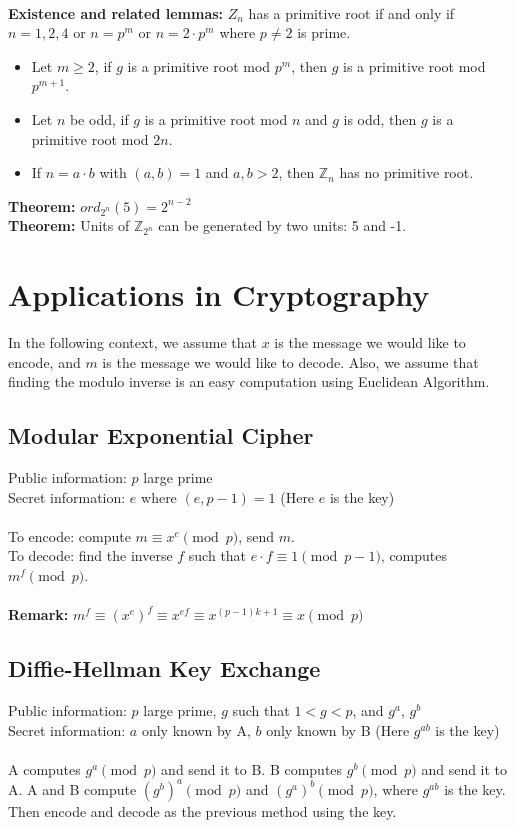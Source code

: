 \documentclass[12pt]{article}
\begin{document}
\\
\textbf{Existence and related lemmas:} $Z_n$ has a primitive root if and only if $n=1,2,4$ or $n=p^m$ or $n=2\cdot p^m$ where $p\neq 2$ is prime.
\begin{itemize}
    \item Let $m\geq 2$, if $g$ is a primitive root mod $p^m$, then $g$ is a primitive root mod $p^{m+1}$.
    \item Let $n$ be odd, if $g$ is a primitive root mod $n$ and $g$ is odd, then $g$ is a primitive root mod $2n$.
    \item If $n=a\cdot b$ with $(a,b)=1$ and $a,b>2$, then $\mathbb{Z}_n$ has no primitive root.
\end{itemize}
\textbf{Theorem:} $ord_{2^n}(5)=2^{n-2}$\\
\textbf{Theorem:} Units of $\mathbb{Z}_{2^n}$ can be generated by two units: 5 and -1.


\section*{Applications in Cryptography}
In the following context, we assume that $x$ is the message we would like to encode, and $m$ is the message we would like to decode. Also, we assume that finding the modulo inverse is an easy computation using Euclidean Algorithm.

\subsection*{Modular Exponential Cipher}
Public information: $p$ large prime\\
Secret information: $e$ where $(e,p-1)=1$ (Here $e$ is the key)\\
\\
To encode: compute $m\equiv x^e\pmod p$, send $m$.\\
To decode: find the inverse $f$ such that $e\cdot f\equiv 1\pmod {p-1}$, computes $m^f\pmod p$.\\
\\
\textbf{Remark:} $m^f\equiv (x^e)^f\equiv x^{ef}\equiv x^{(p-1)k+1}\equiv x\pmod p$

\subsection*{Diffie-Hellman Key Exchange}
Public information: $p$ large prime, $g$ such that $1<g<p$, and $g^a$, $g^b$\\
Secret information: $a$ only known by A, $b$ only known by B (Here $g^{ab}$ is the key)\\
\\
A computes $g^a\pmod p$ and send it to B. B computes $g^b\pmod p$ and send it to A. A and B compute $(g^b)^a\pmod p$ and $(g^a)^b\pmod p$, where $g^{ab}$ is the key. Then encode and decode as the previous method using the key.
\end{document}
